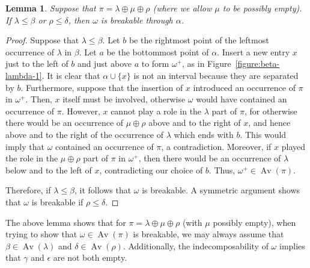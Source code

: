 \documentclass[10pt]{article}
\theoremstyle{plain}
\newtheorem{lemma}[theorem]{Lemma}
\newcommand{\Av}{\operatorname{Av}}
\begin{document}
\begin{lemma}
	Suppose that $\pi= \lambda \oplus \mu \oplus \rho$ (where we allow $\mu$ to be possibly empty). If $\lambda \leq \beta$ or $\rho \leq \delta$, then $\omega$ is breakable through $\alpha$.
\end{lemma}
\begin{proof}
	Suppose that $\lambda \leq \beta$. Let $b$ be the rightmost point of the leftmost occurrence of $\lambda$ in $\beta$. Let $a$ be the bottommost point of $\alpha$. Insert a new entry $x$ just to the left of $b$ and just above $a$ to form $\omega^+$, as in Figure~\ref{figure:beta-lambda-1}. It is clear that $\alpha \cup \{x\}$ is not an interval because they are separated by $b$. Furthermore, suppose that the insertion of $x$ introduced an occurrence of $\pi$ in $\omega^+$. Then, $x$ itself must be involved, otherwise $\omega$ would have contained an occurrence of $\pi$. However, $x$ cannot play a role in the $\lambda$ part of $\pi$, for otherwise there would be an occurrence of $\mu \oplus \rho$ above and to the right of $x$, and hence above and to the right of the occurrence of $\lambda$ which ends with $b$. This would imply that $\omega$ contained an occurrence of $\pi$, a contradiction. Moreover, if $x$ played the role in the $\mu \oplus \rho$ part of $\pi$ in $\omega^+$, then there would be an occurrence of $\lambda$ below and to the left of $x$, contradicting our choice of $b$. Thus, $\omega^+ \in \Av(\pi)$.

Therefore, if $\lambda \leq \beta$, it follows that $\omega$ is breakable. A symmetric argument shows that $\omega$ is breakable if $\rho \leq \delta$.
\end{proof}

The above lemma shows that for $\pi = \lambda \oplus \mu \oplus \rho$ (with $\mu$ possibly empty), when trying to show that $\omega \in \Av(\pi)$ is breakable, we may always assume that $\beta \in \Av(\lambda)$ and $\delta \in \Av(\rho)$. Additionally, the indecomposability of $\omega$ implies that $\gamma$ and $\epsilon$ are not both empty. 
\end{document}
